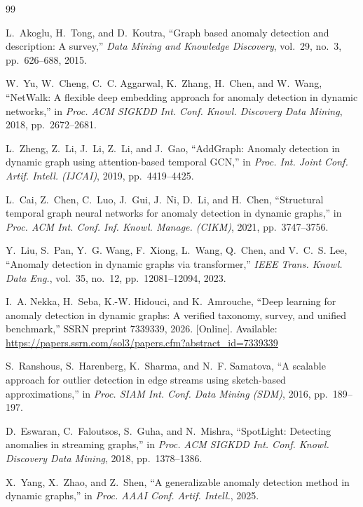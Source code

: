 \documentclass[conference]{IEEEtran}
\begin{document}
\begin{thebibliography}{99}

L.~Akoglu, H.~Tong, and D.~Koutra, ``Graph based anomaly detection and
description: A survey,'' \emph{Data Mining and Knowledge Discovery}, vol.~29,
no.~3, pp.~626--688, 2015.

W.~Yu, W.~Cheng, C.~C. Aggarwal, K.~Zhang, H.~Chen, and W.~Wang, ``NetWalk: A
flexible deep embedding approach for anomaly detection in dynamic networks,'' in
\emph{Proc. ACM SIGKDD Int. Conf. Knowl. Discovery Data Mining}, 2018,
pp.~2672--2681.

L.~Zheng, Z.~Li, J.~Li, Z.~Li, and J.~Gao, ``AddGraph: Anomaly detection in
dynamic graph using attention-based temporal GCN,'' in \emph{Proc. Int. Joint
Conf. Artif. Intell. (IJCAI)}, 2019, pp.~4419--4425.

L.~Cai, Z.~Chen, C.~Luo, J.~Gui, J.~Ni, D.~Li, and H.~Chen, ``Structural
temporal graph neural networks for anomaly detection in dynamic graphs,'' in
\emph{Proc. ACM Int. Conf. Inf. Knowl. Manage. (CIKM)}, 2021, pp.~3747--3756.

Y.~Liu, S.~Pan, Y.~G. Wang, F.~Xiong, L.~Wang, Q.~Chen, and V.~C.~S. Lee,
``Anomaly detection in dynamic graphs via transformer,'' \emph{IEEE Trans.
Knowl. Data Eng.}, vol.~35, no.~12, pp.~12081--12094, 2023.

I.~A. Nekka, H.~Seba, K.-W. Hidouci, and K.~Amrouche, ``Deep learning for
anomaly detection in dynamic graphs: A verified taxonomy, survey, and unified
benchmark,'' SSRN preprint 7339339, 2026. [Online]. Available:
\url{https://papers.ssrn.com/sol3/papers.cfm?abstract_id=7339339}

S.~Ranshous, S.~Harenberg, K.~Sharma, and N.~F. Samatova, ``A scalable approach
for outlier detection in edge streams using sketch-based approximations,'' in
\emph{Proc. SIAM Int. Conf. Data Mining (SDM)}, 2016, pp.~189--197.

D.~Eswaran, C.~Faloutsos, S.~Guha, and N.~Mishra, ``SpotLight: Detecting
anomalies in streaming graphs,'' in \emph{Proc. ACM SIGKDD Int. Conf. Knowl.
Discovery Data Mining}, 2018, pp.~1378--1386.

X.~Yang, X.~Zhao, and Z.~Shen, ``A generalizable anomaly detection method in
dynamic graphs,'' in \emph{Proc. AAAI Conf. Artif. Intell.}, 2025.


\end{thebibliography}
\end{document}
